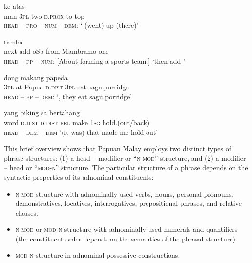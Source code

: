 \ea
\label{Example_8.13}
 {} {} {} {ke} {atas}\\ %
 man  \textsc{3pl}  two  \textsc{d.prox}  to  top\\
\glt 
\textsc{head} – \textsc{pro} – \textsc{num} – \textsc{dem}: ‘ (went) up (there)’ \textstyleExampleSource{[081006-034-CvEx.0010]}
\z

\ea
\label{Example_8.14}
 {tamba} {} {} {} {}\\ %
 next  add  oSb  from  Mambramo  one\\
\glt 
\textsc{head} – \textsc{pp} – \textsc{num}: [About forming a sports team:] ‘then add ’ \textstyleExampleSource{[081023-001-Cv.0002]}
\z

\ea
\label{Example_8.15}
 {} {} {} {dong} {makang} {papeda}\\ %
 \textsc{3pl}  at  Papua  \textsc{d.dist}  \textsc{3pl}  eat  sagu.porridge\\
\glt 
\textsc{head} – \textsc{pp} – \textsc{dem}: ‘, they eat sagu porridge’ \textstyleExampleSource{[081109-009-JR.0001]}
\z

\ea
\label{Example_8.16}
 {} {} {yang} {biking} {sa} {bertahang}\\ %
 word  \textsc{d.dist}  \textsc{d.dist}  \textsc{rel}  make  \textsc{1sg}  hold.(out/back)\\
\glt 
\textsc{head} – \textsc{dem} – \textsc{dem} ‘(it was)  that made me hold out’ \textstyleExampleSource{[081115-001a-Cv.0235]}
\z


This brief overview shows that Papuan Malay employs two distinct types of  phrase structures: (1) a head – modifier or ``\textsc{n-mod}'' structure, and (2) a modifier – head or ``\textsc{mod-n}'' structure. The particular structure of a  phrase depends on the syntactic properties of its adnominal constituents:


\begin{itemize}
\item 
\textsc{n-mod} structure with adnominally used verbs, nouns, personal pronouns, demonstratives, locatives, interrogatives, prepositional phrases, and relative clauses.
\item 
\textsc{n-mod} or \textsc{mod-n} structure with adnominally used numerals and quantifiers (the constituent order depends on the semantics of the phrasal structure).

\item 
\textsc{mod-n} structure in adnominal possessive constructions.

\end{itemize}

